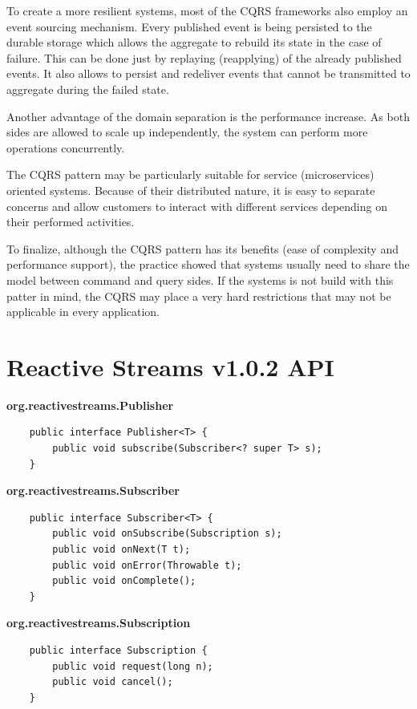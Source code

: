 \documentclass[oneside,
  digital, %
  table,   %
  nolof,     %
  nolot,     %
]{fithesis3}
\begin{document}
To create a more resilient systems, most of the CQRS frameworks also employ an event sourcing mechanism. Every published event is being persisted to the durable storage which allows the aggregate to rebuild its state in the case of failure. This can be done just by replaying (reapplying) of the already published events. It also allows to persist and redeliver events that cannot be transmitted to aggregate during the failed state.

Another advantage of the domain separation is the performance increase. As both sides are allowed to scale up independently, the system can perform more operations concurrently.

The CQRS pattern may be particularly suitable for service (microservices) oriented systems. Because of their distributed nature, it is easy to separate concerns and allow customers to interact with different services depending on their performed activities.

To finalize, although the CQRS pattern has its benefits (ease of complexity and performance support), the practice showed that systems usually need to share the model between command and query sides. If the systems is not build with this patter in mind, the CQRS may place a very hard restrictions that may not be applicable in every application.


\chapter{Reactive Streams v1.0.2 API}
\label{reactive_streams}

\noindent
\textbf{org.reactivestreams.Publisher}

\begin{verbatim}
    public interface Publisher<T> {
        public void subscribe(Subscriber<? super T> s);
    }
\end{verbatim}

\noindent
\textbf{org.reactivestreams.Subscriber}

\begin{verbatim}
    public interface Subscriber<T> {
        public void onSubscribe(Subscription s);
        public void onNext(T t);
        public void onError(Throwable t);
        public void onComplete();
    }
\end{verbatim}

\noindent
\textbf{org.reactivestreams.Subscription}

\begin{verbatim}
    public interface Subscription {
        public void request(long n);
        public void cancel();
    }
\end{verbatim}
\end{document}
